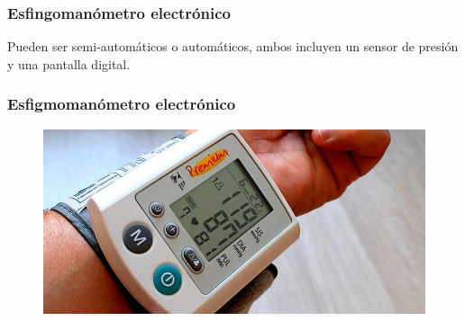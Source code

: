 \documentclass[14pt]{beamer}
\begin{document}
\begin{frame}
\frametitle{Esfingomanómetro electrónico}
Pueden ser semi-automáticos o automáticos, ambos incluyen un sensor de presión y una pantalla digital.
\end{frame}
\begin{frame}
\frametitle{Esfigmomanómetro electrónico}
\vspace*{-1cm}
\begin{figure}
    \centering
    \includegraphics[scale=0.35]{Imagenes/Esfigmomanometro_08.jpg}
\end{figure}
\end{frame}
\end{document}

